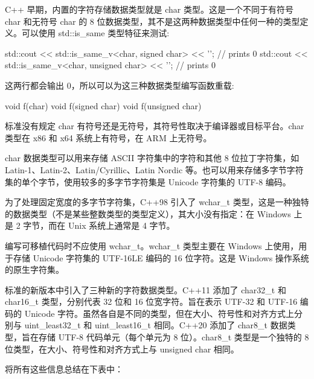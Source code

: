 
C++ 早期，内置的字符存储数据类型就是 char 类型。这是一个不同于有符号 char 和无符号 char 的 8 位数据类型，其不是这两种数据类型中任何一种的类型定义。可以使用 std::is\_same 类型特征来测试:

\begin{cpp}
std::cout << std::is_same_v<char, signed char> << '\n';   // prints 0
std::cout << std::is_same_v<char, unsigned char> << '\n'; // prints 0
\end{cpp}

这两行都会输出 0，所以可以为这三种数据类型编写函数重载:

\begin{cpp}
void f(char) {}
void f(signed char) {}
void f(unsigned char) {}
\end{cpp}

标准没有规定 char 有符号还是无符号，其符号性取决于编译器或目标平台。char 类型在 x86 和 x64 系统上有符号，在 ARM 上无符号。

char 数据类型可以用来存储 ASCII 字符集中的字符和其他 8 位拉丁字符集，如 Latin-1、Latin-2、Latin/Cyrillic、Latin Nordic 等。也可以用来存储多字节字符集的单个字节，使用较多的多字节字符集是 Unicode 字符集的 UTF-8 编码。

为了处理固定宽度的多字节字符集，C++98 引入了 wchar\_t 类型，这是一种独特的数据类型（不是某些整数类型的类型定义），其大小没有指定：在 Windows 上是 2 字节，而在 Unix 系统上通常是 4 字节。

编写可移植代码时不应使用 wchar\_t。wchar\_t 类型主要在 Windows 上使用，用于存储 Unicode 字符集的 UTF-16LE 编码的 16 位字符。这是 Windows 操作系统的原生字符集。

标准的新版本中引入了三种新的字符数据类型。C++11 添加了 char32\_t 和 char16\_t 类型，分别代表 32 位和 16 位宽字符。旨在表示 UTF-32 和 UTF-16 编码的 Unicode 字符。虽然各自是不同的类型，但在大小、符号性和对齐方式上分别与 uint\_least32\_t 和 uint\_least16\_t 相同。C++20 添加了 char8\_t 数据类型，旨在存储 UTF-8 代码单元（每个单元为 8 位）。char8\_t 类型是一个独特的 8 位类型，在大小、符号性和对齐方式上与 unsigned char 相同。

将所有这些信息总结在下表中：

